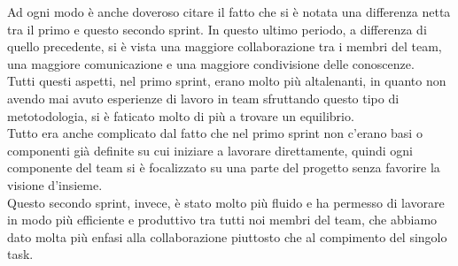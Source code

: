 \documentclass{article}
\begin{document}
\noindent Ad ogni modo è anche doveroso citare il fatto che si è notata una differenza netta tra il primo e questo secondo sprint. In questo ultimo periodo, a differenza di quello precedente, si è vista una maggiore collaborazione tra i membri del team, una maggiore comunicazione e una maggiore condivisione delle conoscenze.\\
Tutti questi aspetti, nel primo sprint, erano molto più altalenanti, in quanto non avendo mai avuto esperienze di lavoro in team sfruttando questo tipo di metotodologia, si è faticato molto di più a trovare un equilibrio.\\
Tutto era anche complicato dal fatto che nel primo sprint non c'erano basi o componenti già definite su cui iniziare a lavorare direttamente, quindi ogni componente del team si è focalizzato su una parte del progetto senza favorire la visione d'insieme.\\
Questo secondo sprint, invece, è stato molto più fluido e ha permesso di lavorare in modo più efficiente e produttivo tra tutti noi membri del team, che abbiamo dato molta più enfasi alla collaborazione piuttosto che al compimento del singolo task.\\
\end{document}
